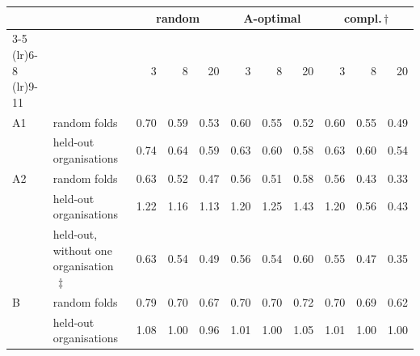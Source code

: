 \begin{tabular}{@{}ll@{\hspace{9pt}}rrr@{\hspace{9pt}}rrr@{\hspace{9pt}}rrr@{}}
\toprule
& & \multicolumn{3}{c}{random} & \multicolumn{3}{c}{A-optimal} & \multicolumn{3}{c}{compl.\,$\dagger$} \\
\cmidrule(lr){3-5} \cmidrule(lr){6-8} \cmidrule(lr){9-11}
& & 3 & 8 & 20 & 3 & 8 & 20 & 3 & 8 & 20 \\
\midrule
A1 & random folds & 0.70 & 0.59 & 0.53 & 0.60 & 0.55 & 0.52 & 0.60 & 0.55 & 0.49 \\
 & held-out organisations & 0.74 & 0.64 & 0.59 & 0.63 & 0.60 & 0.58 & 0.63 & 0.60 & 0.54 \\
\addlinespace[2pt]
A2 & random folds & 0.63 & 0.52 & 0.47 & 0.56 & 0.51 & 0.58 & 0.56 & 0.43 & 0.33 \\
 & held-out organisations & 1.22 & 1.16 & 1.13 & 1.20 & 1.25 & 1.43 & 1.20 & 0.56 & 0.43 \\
 & held-out, without one organisation$\,\ddagger$ & 0.63 & 0.54 & 0.49 & 0.56 & 0.54 & 0.60 & 0.55 & 0.47 & 0.35 \\
\addlinespace[2pt]
B & random folds & 0.79 & 0.70 & 0.67 & 0.70 & 0.70 & 0.72 & 0.70 & 0.69 & 0.62 \\
 & held-out organisations & 1.08 & 1.00 & 0.96 & 1.01 & 1.00 & 1.05 & 1.01 & 1.00 & 1.00 \\
\bottomrule
\end{tabular}
